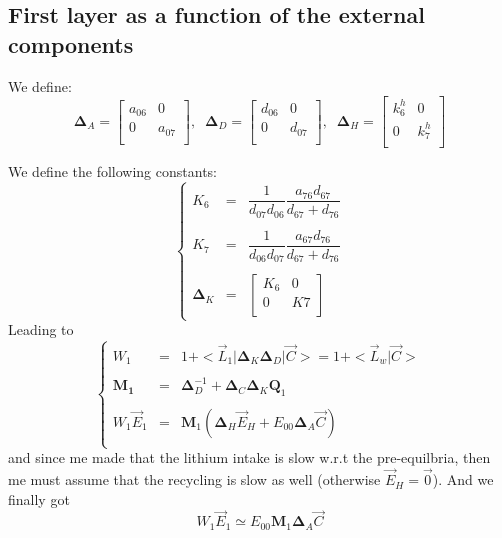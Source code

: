 \documentclass[aps,onecolumn,11pt]{revtex4}
\newcommand{\mymat}[1]{{\bm{#1}}}
\begin{document}
\subsection{First layer as a function of the external components}
We define:
\begin{equation}
\mymat{\Delta}_A =\begin{bmatrix}
a_{06} & 0 \\
0 & a_{07} \\
\end{bmatrix},\;\;
\mymat{\Delta}_D = 
\begin{bmatrix}
d_{06} & 0 \\
0 & d_{07} \\
\end{bmatrix},\;\;
\mymat{\Delta}_H =
\begin{bmatrix}
k^h_6 & 0 \\
0 & k^h_7 \\
\end{bmatrix}
\end{equation}

We define the following constants:
\begin{equation}
\left\lbrace
\begin{array}{rcl}
K_6 & = & \dfrac{1}{d_{07}d_{06}}  \dfrac{a_{76}d_{67}}{d_{67}+d_{76}} \\
\\
K_7 & = &  \dfrac{1}{d_{06}d_{07}} \dfrac{a_{67}d_{76}}{d_{67}+d_{76}} \\
\\
\mymat{\Delta}_K & = & \begin{bmatrix} K_6 & 0 \\ 0 & K7 \\ \end{bmatrix}
\end{array}
\right.
\end{equation}
Leading to
\begin{equation}
\left\lbrace
\begin{array}{rcl}
W_1 & = & 1 +  <\vec{L}_1| \mymat{\Delta}_K \mymat{\Delta}_D | \vec{C}> = 1+ <\vec{L}_w|\vec{C}> \\
\\
\mymat{M_1} & = & \mymat{\Delta}_D^{-1} + \mymat{\Delta}_C \mymat{\Delta}_K \mymat{Q}_1 \\
\\
W_1 \vec{E}_1 & = & \mymat{M}_1 \left( 
	\mymat{\Delta}_H \vec{E}_H + E_{00} \mymat{\Delta}_A \vec{C}
	\right)\\
\end{array}
\right.
\end{equation}
and since me made that the lithium intake is slow w.r.t the pre-equilbria, then me must assume that the
recycling is slow as well (otherwise $\vec{E}_H=\vec{0}$).
And we finally got
\begin{equation}
	W_1 \vec{E}_1  \simeq E_{00} \mymat{M}_1  \mymat{\Delta}_A \vec{C}
\end{equation}
\end{document}
